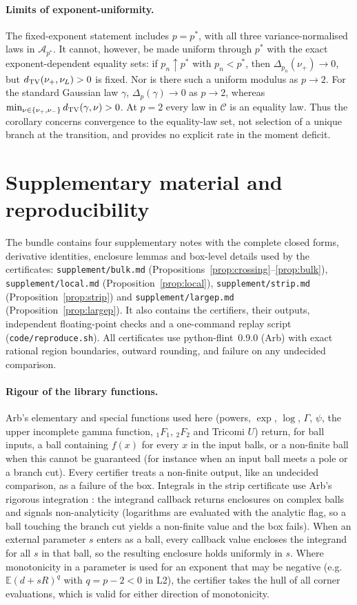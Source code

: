 \documentclass[11pt]{article}
\theoremstyle{remark}
\newcommand{\E}{\mathbb E}
\begin{document}
\paragraph{Limits of exponent-uniformity.}
The fixed-exponent statement includes $p=p^*$, with all three
variance-normalised laws in $\mathcal A_{p^*}$. It cannot, however,
be made uniform through $p^*$ with the exact exponent-dependent
equality sets: if $p_n\uparrow p^*$ with $p_n<p^*$, then
$\Delta_{p_n}(\nu_+)\to0$, but
$d_{\rm TV}(\nu_+,\nu_L)>0$ is fixed.
Nor is there such a uniform modulus as $p\to2$. For the standard
Gaussian law $\gamma$, $\Delta_p(\gamma)\to0$ as $p\to2$, whereas
$\min_{\nu\in\{\nu_+,\nu_-\}}d_{\rm TV}(\gamma,\nu)>0$.
At $p=2$ every law in $\mathcal C$ is an equality law.
Thus the corollary concerns convergence to the equality-law set, not
selection of a unique branch at the transition, and provides no
explicit rate in the moment deficit.

\section*{Supplementary material and reproducibility}
The bundle contains four supplementary notes with the complete closed forms, derivative identities, enclosure lemmas and box-level details used by the certificates: \texttt{supplement/bulk.md} (Propositions~\ref{prop:crossing}--\ref{prop:bulk}), \texttt{supplement/local.md} (Proposition~\ref{prop:local}), \texttt{supplement/strip.md} (Proposition~\ref{prop:strip}) and \texttt{supplement/largep.md} (Proposition~\ref{prop:largep}). It also contains the certifiers, their outputs, independent floating-point checks and a one-command replay script (\texttt{code/reproduce.sh}). All certificates use python-flint~0.9.0 (Arb) \cite{Johansson} with exact rational region boundaries, outward rounding, and failure on any undecided comparison.

\paragraph{Rigour of the library functions.} Arb's elementary and special functions used here (powers, $\exp$, $\log$, $\Gamma$, $\psi$, the upper incomplete gamma function, ${}_1F_1$, ${}_2F_2$ and Tricomi $U$) return, for ball inputs, a ball containing $f(x)$ for every $x$ in the input balls, or a non-finite ball when this cannot be guaranteed (for instance when an input ball meets a pole or a branch cut). Every certifier treats a non-finite output, like an undecided comparison, as a failure of the box. Integrals in the strip certificate use Arb's rigorous integration \cite{JohanssonInt}: the integrand callback returns enclosures on complex balls and signals non-analyticity (logarithms are evaluated with the analytic flag, so a ball touching the branch cut yields a non-finite value and the box fails). When an external parameter $s$ enters as a ball, every callback value encloses the integrand for all $s$ in that ball, so the resulting enclosure holds uniformly in $s$. Where monotonicity in a parameter is used for an exponent that may be negative (e.g.\ $\E(d+sR)^q$ with $q=p-2<0$ in L2), the certifier takes the hull of all corner evaluations, which is valid for either direction of monotonicity.
\end{document}
